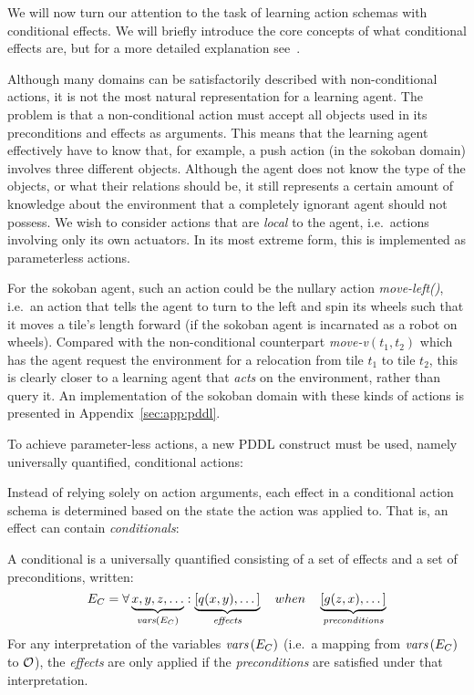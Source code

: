 \documentclass[../Master.tex]{subfiles}
\begin{document}
We will now turn our attention to the task of learning action schemas with conditional effects. 
We will briefly introduce the core concepts of what conditional effects are, but for a more detailed explanation see~. 

Although many domains can be satisfactorily described with non-conditional actions, it is not the most natural representation for a learning agent. The problem is that a non-conditional action must accept all objects used in its preconditions and effects as arguments. This means that the learning agent effectively have to know that, for example, a push action (in the sokoban domain) involves three different objects. Although the agent does not know the type of the objects, or what their relations should be, it still represents a certain amount of knowledge about the environment that a completely ignorant agent should not possess. We wish to consider actions that are \emph{local} to the agent, i.e.\ actions involving only its own actuators. In its most extreme form, this is implemented as parameterless actions. 

For the sokoban agent, such an action could be the nullary action \textit{move-left()}, i.e.\ an action that tells the agent to turn to the left and spin its wheels such that it moves a tile's length forward (if the sokoban agent is incarnated as a robot on wheels). Compared with the non-conditional counterpart \textit{move-v}$(t_1, t_2)$ which has the agent request the environment for a relocation from tile $t_1$ to tile $t_2$, this is clearly closer to a learning agent that \textit{acts} on the environment, rather than query it. An implementation of the sokoban domain with these kinds of actions is presented in Appendix~\ref{sec:app:pddl}.

To achieve parameter-less actions, a new PDDL construct must be used, namely universally quantified, conditional actions:

Instead of relying solely on action arguments, each effect in a conditional action schema is determined based on the state the action was applied to. That is, an effect can contain \emph{conditionals}:
\begin{definition}[Conditional]
    A conditional is a universally quantified consisting of a set of effects and a set of preconditions, written:
\begin{equation*}
    E_C = \forall \underbrace{x, y, z, \dots}_{\textit{vars} \left(E_C\right)} : 
    \underbrace{\left[ q(x, y), \dots \right]}_{\textit{effects}} \quad when \quad 
    \underbrace{\left[ g(z, x), \dots  \right]}_{\textit{preconditions}}
\end{equation*}
For any interpretation of the variables $\textit{vars}\left(E_C\right)$ (i.e.\ a mapping from $\textit{vars}\left(E_C\right)$ to $\mathcal{O}$), the \textit{effects} are only applied if the \textit{preconditions} are satisfied under that interpretation. 
\end{definition}
\end{document}
